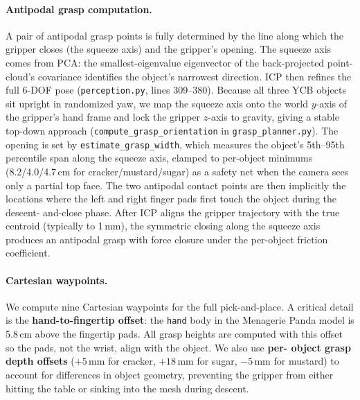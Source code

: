 \documentclass[11pt]{article}
\begin{document}
\paragraph{Antipodal grasp computation.}
A pair of antipodal grasp points is fully determined by the line along
which the gripper closes (the squeeze axis) and the gripper's opening.
The squeeze axis comes from PCA: the smallest-eigenvalue eigenvector of
the back-projected point-cloud's covariance identifies the object's
narrowest direction. ICP then refines the full 6-DOF pose
(\texttt{perception.py}, lines 309--380). Because all three YCB objects
sit upright in randomized yaw, we map the squeeze axis onto the world
$y$-axis of the gripper's hand frame and lock the gripper $z$-axis to
gravity, giving a stable top-down approach
(\texttt{compute\_grasp\_orientation} in \texttt{grasp\_planner.py}).
The opening is set by \texttt{estimate\_grasp\_width}, which measures
the object's 5th--95th percentile span along the squeeze axis, clamped
to per-object minimums (8.2/4.0/4.7\,cm for cracker/mustard/sugar) as
a safety net when the camera sees only a partial top face. The two
antipodal contact points are then implicitly the locations where the
left and right finger pads first touch the object during the descent-
and-close phase. After ICP aligns the gripper trajectory with the true
centroid (typically to 1\,mm), the symmetric closing along the squeeze
axis produces an antipodal grasp with force closure under the
per-object friction coefficient.

\paragraph{Cartesian waypoints.}
We compute nine Cartesian waypoints for the full pick-and-place. A
critical detail is the \textbf{hand-to-fingertip offset}: the
\texttt{hand} body in the Menagerie Panda model is 5.8\,cm above the
fingertip pads. All grasp heights are computed with this offset so the
pads, not the wrist, align with the object. We also use \textbf{per-
object grasp depth offsets} ($+5$\,mm for cracker, $+18$\,mm for sugar,
$-5$\,mm for mustard) to account for differences in object geometry,
preventing the gripper from either hitting the table or sinking into
the mesh during descent.
\end{document}
